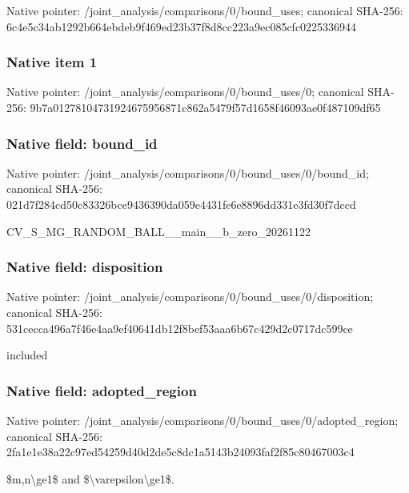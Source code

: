 \documentclass[10pt,a4paper]{article}
\begin{document}
Native pointer: /joint\_analysis/comparis\allowbreak{}ons/0/bound\_uses; canonical SHA-256: 6c4e5c34ab1292b664ebdeb9\allowbreak{}f469ed23b37f8d8cc223a9ec\allowbreak{}085cfc0225336944



\subsubsection{Native item 1}


Native pointer: /joint\_analysis/comparis\allowbreak{}ons/0/bound\_uses/0; canonical SHA-256: 9b7a01278104731924675956\allowbreak{}871c862a5479f57d1658f460\allowbreak{}93ae0f487109df65



\subsubsection{Native field: bound\_id}


Native pointer: /joint\_analysis/comparis\allowbreak{}ons/0/bound\_uses/0/bound\allowbreak{}\_id; canonical SHA-256: 021d7f284cd50c83326bce94\allowbreak{}36390da059e4431fe6e8896d\allowbreak{}d331e3fd30f7dccd


CV\_S\_MG\_RANDOM\_BALL\_\_mai\allowbreak{}n\_\_b\_zero\_20261122


\subsubsection{Native field: disposition}


Native pointer: /joint\_analysis/comparis\allowbreak{}ons/0/bound\_uses/0/dispo\allowbreak{}sition; canonical SHA-256: 531cecca496a7f46e4aa9ef4\allowbreak{}0641db12f8bef53aaa6b67c4\allowbreak{}29d2c0717dc599ce


included


\subsubsection{Native field: adopted\_region}


Native pointer: /joint\_analysis/comparis\allowbreak{}ons/0/bound\_uses/0/adopt\allowbreak{}ed\_region; canonical SHA-256: 2fa1e1e38a22c97ed54259d4\allowbreak{}0d2de5c8dc1a5143b24093fa\allowbreak{}f2f85c80467003c4


\$m,n\textbackslash{}ge1\$ and \$\textbackslash{}varepsilon\textbackslash{}ge1\$.
\end{document}
